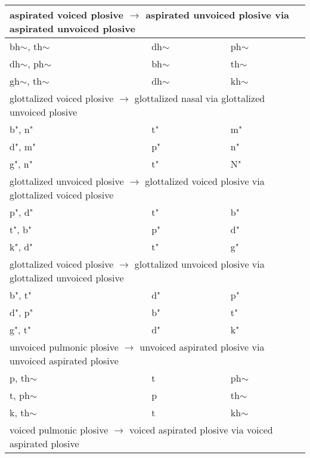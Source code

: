 \documentclass[6pt]{article}
\begin{document}
\begin{longtable}{ l | l | l }
 \hline \multicolumn{3}{l}{aspirated voiced plosive $\rightarrow$ aspirated unvoiced plosive via aspirated unvoiced plosive    }\\  \hline
bh$\sim$, th$\sim$ & dh$\sim$ & ph$\sim$ \\
dh$\sim$, ph$\sim$ & bh$\sim$ & th$\sim$ \\
gh$\sim$, th$\sim$ & dh$\sim$ & kh$\sim$ \\

 \hline \multicolumn{3}{l}{glottalized voiced plosive $\rightarrow$  glottalized nasal via glottalized unvoiced plosive }\\  \hline
b", n" & t" & m" \\
d", m" & p" & n" \\
g", n" & t" & N" \\

 \hline \multicolumn{3}{l}{glottalized unvoiced plosive $\rightarrow$ glottalized voiced plosive via glottalized voiced plosive   }\\  \hline
p", d" & t" & b" \\
t", b" & p" & d" \\
k", d" & t" & g" \\

 \hline \multicolumn{3}{l}{glottalized voiced plosive $\rightarrow$ glottalized unvoiced plosive via glottalized unvoiced plosive   }\\  \hline
b", t" & d" & p" \\
d", p" & b" & t" \\
g", t" & d" & k" \\

%
%
%
%
\hline\multicolumn{3}{l}{unvoiced pulmonic plosive  $\rightarrow$ unvoiced aspirated plosive via unvoiced aspirated plosive }\\  \hline

p, th$\sim$ & t & ph$\sim$ \\
t, ph$\sim$ & p & th$\sim$ \\
k, th$\sim$ & t & kh$\sim$ \\

\hline \multicolumn{3}{l}{voiced pulmonic plosive  $\rightarrow$ voiced aspirated plosive via voiced aspirated plosive  }\\  \hline


\end{longtable}
\end{document}
